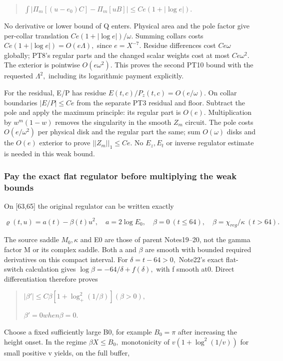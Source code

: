 \begin{quote}\small
\(\int |\Pi_{m}[(u-e_{0})C]-\Pi_{m}[uB]| \le Ce(1+|\log e|).\)\par
\end{quote}
No derivative or lower bound of Q enters. Physical area and the pole factor give per-collar translation \(Ce(1+|\log e|)/\omega.\) Summing collars costs \(Ce(1+|\log e|)=O(e \Lambda),\) since \(e=X^{-7}.\) Residue differences cost \(Ce \omega\) globally; PT8's regular parts and the changed scalar weights cost at most \(Ce \omega^{2}.\) The exterior is pointwise \(O(e \omega^{2}).\) This proves the second PT10 bound with the requested \(\Lambda^{2},\) including its logarithmic payment explicitly.

For the residual, E/P has residue \(E(t,c)/P_{z}(t,c)=O(e/\omega).\) On collar boundaries \(|E/P|\le Ce\) from the separate PT3 residual and floor. Subtract the pole and apply the maximum principle: its regular part is \(O(e).\) Multiplication by \(w^{m}(1-w)\) removes the singularity in the smooth \(Z_{m}\) circuit. The pole costs \(O(e/\omega^{2})\) per physical disk and the regular part the same; sum \(O(\omega)\) disks and the \(O(e)\) exterior to prove \(||Z_{m}||_1\le Ce.\) No \(E_{z}, E_{t}\) or inverse regulator estimate is needed in this weak bound.

\subsubsection{Pay the exact flat regulator before multiplying the weak bounds}
\label{subsec:pt-4}

On [63,65] the original regulator can be written exactly

\[
\varrho(t,u)=a(t)-\beta(t)u^2,\quad a=2\log E_0,\quad
\beta=0\ (t\le64),\quad \beta=\chi_{reg}/\kappa\ (t>64).
\tag{PT11}\label{eq:ansatz-pt11}
\]

The source saddle \(M_{0},\kappa\) and E0 are those of parent Notes19--20, not the gamma factor M or its complex saddle. Both a and \(\beta\) are smooth with bounded required derivatives on this compact interval. For \(\delta=t-64>0,\) Note22's exact flat-switch calculation gives \(\log \beta=-64/\delta+f(\delta),\) with f smooth at0. Direct differentiation therefore proves

\begin{quote}\small
\(|\beta'|\le C \beta[1+\log_+^{2}(1/\beta)]   (\beta>0),\)\par
\(\beta'=0 when \beta=0.\)\par
\end{quote}
Choose a fixed sufficiently large B0, for example \(B_{0}=\pi\) after increasing the height onset. In the regime \(\beta X\le B_{0},\) monotonicity of \(v(1+\log^{2}(1/v))\) for small positive v yields, on the full buffer,


